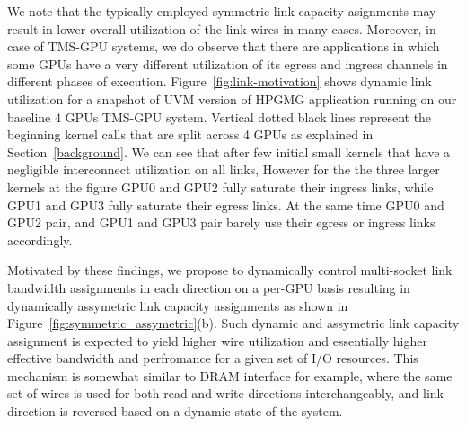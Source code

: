 We note that the typically employed symmetric link
capacity asignments may result in lower overall utilization of the link wires
in many cases. Moreover, in case of TMS-GPU systems, we do observe that there
are applications in which some GPUs have a very different utilization of its
egress and ingress channels in different phases of execution.
Figure~\ref{fig:link-motivation} shows dynamic link utilization for a snapshot
of UVM version of HPGMG application running on our baseline 4 GPUs TMS-GPU
system. Vertical dotted black lines represent the beginning kernel calls that
are split across 4 GPUs as explained in Section~\ref{background}. We can see
that after few initial small kernels that have a negligible interconnect
utilization on all links, However for the the three larger kernels at the
figure GPU0 and GPU2 fully saturate their ingress links, while GPU1 and GPU3
fully saturate their egress links. At the same time GPU0 and GPU2 pair,
and GPU1 and GPU3 pair barely use their egress or ingress links accordingly.


Motivated by these findings, we propose to dynamically control multi-socket
link bandwidth assignments in each direction on a per-GPU basis resulting in
dynamically assymetric link capacity assignments as shown in
Figure~\ref{fig:symmetric_assymetric}(b). Such dynamic and assymetric link
capacity assignment is expected to yield higher wire utilization and
essentially higher effective bandwidth and perfromance for a given set of I/O
resources. This mechanism is somewhat similar to DRAM interface for example,
where the same set of wires is used for both read and write directions
interchangeably, and link direction is reversed based on a dynamic state of the
system. 



